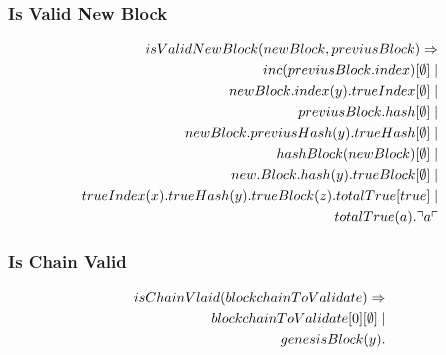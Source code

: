 \subsubsection{Is Valid New Block}

\begin{align*}
isValidNewBlock(newBlock, previusBlock) \Rightarrow\\
inc(previusBlock.index)[\mathbf{\emptyset}] \mid \\
newBlock.index(y).trueIndex[\mathbf{\emptyset}] \mid \\
previusBlock.hash[\mathbf{\emptyset}] \mid \\
newBlock.previusHash(y).trueHash[\mathbf{\emptyset}] \mid \\
hashBlock(newBlock)[\mathbf{\emptyset}] \mid \\
new.Block.hash(y).trueBlock[\mathbf{\emptyset}] \mid \\
trueIndex(x).trueHash(y).trueBlock(z).totalTrue[true] \mid \\
totalTrue(a).\urcorner a \ulcorner
\end{align*}

\subsubsection{Is Chain Valid}

\begin{align*}
isChainVlaid(blockchainToValidate) \Rightarrow\\
blockchainToValidate[0][\mathbf{\emptyset}] \mid \\
genesisBlock(y).
\end{align*}


